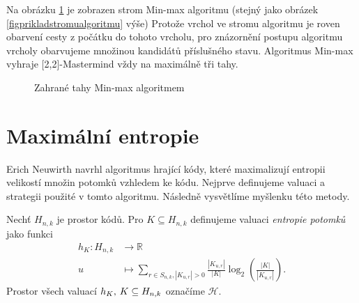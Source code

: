 Na obrázku \ref{fig22minmax} je zobrazen strom Min-max algoritmu (stejný jako obrázek \ref{figprikladstromualgoritmu} výše) Protože vrchol ve stromu algoritmu je roven obarvení cesty z počátku do tohoto vrcholu, pro znázornění postupu algoritmu vrcholy obarvujeme množinou kandidátů příslušného stavu. Algoritmus Min-max vyhraje [2,2]-Mastermind vždy na maximálně tři tahy. 
\begin{figure}[h!]
    \centering
    \caption{Zahrané tahy Min-max algoritmem}
\label{fig22minmax}
\end{figure}



\section{Maximální entropie}
Erich Neuwirth \cite{neuwirth} navrhl algoritmus hrající kódy, které maximalizují entropii velikostí množin potomků vzhledem ke kódu. Nejprve definujeme valuaci a strategii použité v tomto algoritmu. Následně vysvětlíme myšlenku této metody.

\begin{definice}\label{defentropierozdeleni}
    Nechť $H_{n,k}$ je prostor kódů. Pro $K \subseteq H_{n,k}$ definujeme valuaci \emph{entropie potomků} jako funkci
    \begin{align*}
        h_K \colon H_{n,k} &\to \mathbb{R} \\
        u &\mapsto \sum_{r\in S_{n,k}, |K_{u,r}| > 0} \frac{|K_{u,r}|}{|K|}\log_2\left( \frac{|K|}{|K_{u,r}|} \right).
    \end{align*}
    Prostor všech valuací $h_K, \hspace{2px} K \subseteq H_{n,k}$ označíme $\mathcal{H}$. 
\end{definice}

